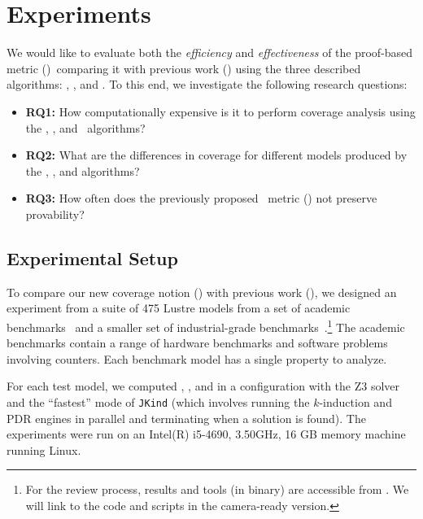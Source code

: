 \section{Experiments}
\label{sec:experiments}

We would like to evaluate both the {\em efficiency} and {\em
  effectiveness} of the proof-based metric (\ivccov)~comparing it with previous work (\nondetcov) using the three described algorithms: \ucalg, \ucbfalg, and \mustalg. To this end, we investigate the following research questions:
\begin{itemize}
    \item \textbf{RQ1:} How computationally expensive is it to perform coverage analysis using the \ucalg, \ucbfalg, and \mustalg\ algorithms?
    \item \textbf{RQ2:} What are the differences in coverage for different models produced by the \ucalg, \ucbfalg, and \mustalg algorithms?
    \item \textbf{RQ3:} How often does the previously proposed \nondetcov\ metric (\mustalg) not preserve provability?
\end{itemize}

\subsection{Experimental Setup}

To compare our new coverage notion (\ivccov) with previous work (\nondetcovalt), we designed an experiment from a suite of 475 Lustre models from a set of academic benchmarks~\cite{Hagen08:FMCAD} and a smaller set
of industrial-grade benchmarks~\cite{QFCS15:backes,hilt2013}.\footnote{For the review process, results and tools (in binary) are accessible from \cite{anoexpr}. We will link to the code and scripts in the camera-ready version.}
The academic benchmarks contain a range of hardware benchmarks and
software problems involving counters. Each benchmark model has a single property to analyze.

For each test model, we computed \ucalg, \ucbfalg, and \mustalg in a configuration with
the Z3 solver and the ``fastest'' mode of \texttt{JKind} (which involves running the $k$-induction and PDR engines
in parallel and terminating when a solution is found). The experiments were run on an
Intel(R) i5-4690, 3.50GHz, 16 GB memory machine running Linux.




